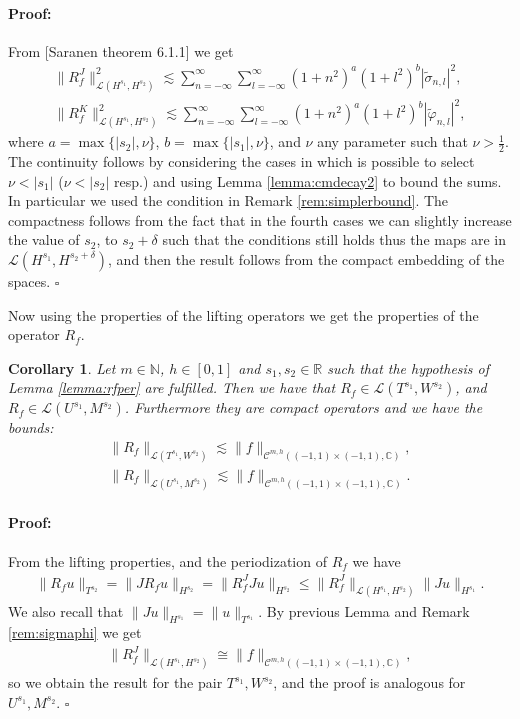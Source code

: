 \documentclass{article}
\newtheorem{corollary}[theorem]{Corollary}
\newenvironment{proof}{\paragraph{Proof:}}{\hfill$\square$}
\newcommand{\todo}[1]{{\color{red}[#1]}}
\newcommand{\IC}{{\mathbb C}}
\newcommand{\IN}{{\mathbb N}}
\newcommand{\IR}{{\mathbb R}}
\newcommand{\cmspaceh}[4]{\mathcal{C}^{#1,#2} \left( #3, #4 \right)}
\newcommand{\iinterv}{(-1,1)\times(-1,1)}
\begin{document}
\begin{proof}
From \todo{Saranen theorem 6.1.1} we get
\begin{align*}
\| R^J_f\|_{ \mathcal{L}(H^{s_1},H^{s_2})}^2 \lesssim \sum_{n=-\infty}^\infty \sum_{l=-\infty}^\infty  (1+n^2)^{a}(1+l^2)^{b}|\widetilde{\sigma}_{n,l}|^2,\\
\| R^K_f\|_{ \mathcal{L}(H^{s_1},H^{s_2})}^2 \lesssim \sum_{n=-\infty}^\infty \sum_{l=-\infty}^\infty  (1+n^2)^{a}(1+l^2)^{b}|\widetilde{\varphi}_{n,l}|^2,
\end{align*}
where $a = \max\{|s_2|, \nu\}$, $b = \max\{|s_1|, \nu\} $, and $\nu$ any parameter such that $\nu > \frac{1}{2}$. The continuity follows by considering the cases in which is possible to select $\nu < |s_1|$ ($\nu < |s_2|$ resp.) and using Lemma \ref{lemma:cmdecay2} to bound the sums. In particular we used the condition in Remark \ref{rem:simplerbound}. 
The compactness follows from the fact that in the fourth cases we can slightly increase the value of $s_2$, to $s_2 + \delta$  such that the conditions still holds thus the maps are in $\mathcal{L}(H^{s_1},H^{s_2+\delta})$, and then the result follows from the compact embedding of the spaces. 
\end{proof}

Now using the properties of the lifting operators we get the properties of the operator $R_f$. 

\begin{corollary}
\label{corollary:rfop}
Let $m \in \IN$, $h \in [0,1]$ and $s_1, s_2  \in \IR$ such that the hypothesis of Lemma \ref{lemma:rfper} are fulfilled. Then we have that 
$R_f  \in \mathcal{L}(T^{s_1},W^{s_2})$, and $R_f \in \mathcal{L}(U^{s_1},M^{s_2})$. Furthermore they are compact operators and we have the bounds:
\begin{align*}
\| R_f\|_{ \mathcal{L}(T^{s_1},W^{s_2})} \lesssim \|f\|_{\cmspaceh{m}{h}{\iinterv}{\IC}},\\
\| R_f\|_{ \mathcal{L}(U^{s_1},M^{s_2})} \lesssim \|f\|_{\cmspaceh{m}{h}{\iinterv}{\IC}}.
\end{align*}
\end{corollary}
\begin{proof}
From the lifting properties, and the periodization of $R_f$ we have 
\begin{align*}
\| R_f u\|_{T^{s_2}} = \|  J R_f u \|_{H^{s_2}} = \|R_f^J Ju \|_{H^{s_2}} \leq \| R_f^J\|_{\mathcal{L}(H^{s_1},H^{s_2})} \|J u \|_{H^{s_1}}. 
\end{align*}
We also recall that $\|J u \|_{H^{s_1}} = \|u\|_{T^{s_1}}$. By previous Lemma and Remark \ref{rem:sigmaphi} we get 
\begin{align*}
\| R_f^J\|_{\mathcal{L}(H^{s_1},H^{s_2})} \cong \|f\|_{\cmspaceh{m}{h}{\iinterv}{\IC}},
\end{align*}
so we obtain the result for the pair $T^{s_1}, W^{s_2}$, and the proof is analogous for $U^{s_1},M^{s_2}$.
\end{proof}
\end{document}
